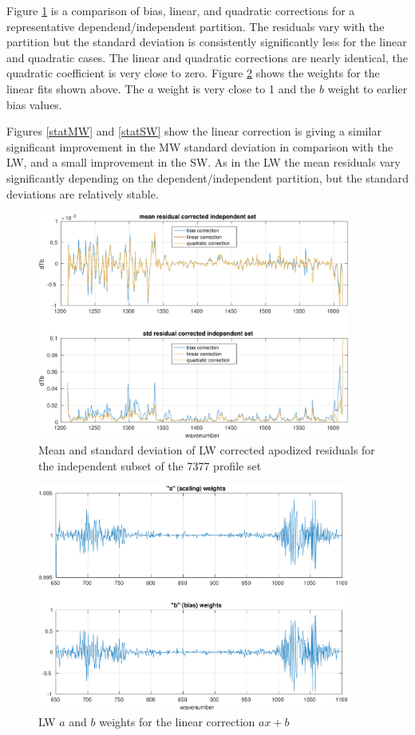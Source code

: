 \documentclass[11pt]{article}
\begin{document}
Figure \ref{statLW} is a comparison of bias, linear, and quadratic
corrections for a representative dependend/independent partition.
The residuals vary with the partition but the standard deviation is
consistently significantly less for the linear and quadratic cases.
The linear and quadratic corrections are nearly identical, the
quadratic coefficient is very close to zero.  Figure \ref{coefLW}
shows the weights for the linear fits shown above.  The $a$ weight
is very close to 1 and the $b$ weight to earlier bias values.

Figures \ref{statMW} and \ref{statSW} show the linear correction 
is giving a similar significant improvement in the MW standard
deviation in comparison with the LW, and a small improvement in the
SW.  As in the LW the mean residuals vary significantly depending on
the dependent/independent partition, but the standard deviations are
relatively stable.

\begin{figure} %
  \centering
  \includegraphics[height=7.5cm]{figures/a2cris_stat_LW.pdf}
  \caption{Mean and standard deviation of LW corrected apodized
    residuals for the independent subset of the 7377 profile set}
  \label{statLW}
\end{figure}

\begin{figure} %
  \centering
  \includegraphics[height=7.5cm]{figures/a2cris_coef_LW.pdf}
  \caption{LW $a$ and $b$ weights for the linear correction $ax+b$}
  \label{coefLW}
\end{figure}
\end{document}
